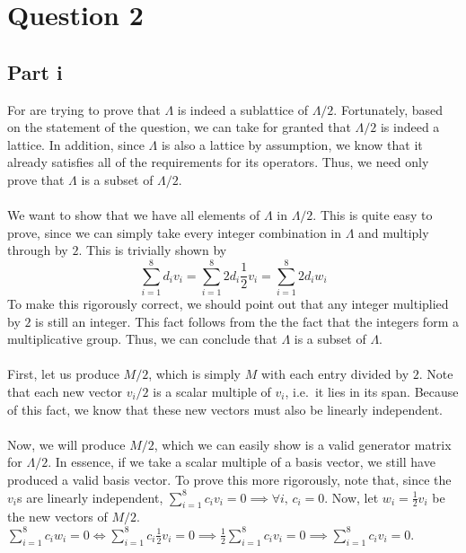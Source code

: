\documentclass[letterpaper]{article}
\begin{document}
\section{Question 2}
\label{sec:Question2}

\subsection{Part i}
\label{sub:2Parti}

For are trying to prove that $ \Lambda $ is indeed a sublattice of $ \Lambda / 2 $.
Fortunately, based on the statement of the question, we can take for granted that $ \Lambda / 2 $ is indeed a lattice.
In addition, since $ \Lambda $ is also a lattice by assumption, we know that it already satisfies all of the requirements for its operators.
Thus, we need only prove that $ \Lambda $ is a subset of $ \Lambda / 2 $.
\\ \\
We want to show that we have all elements of $ \Lambda $ in $ \Lambda / 2 $.
This is quite easy to prove, since we can simply take every integer combination in $ \Lambda $ and multiply through by $ 2 $.
This is trivially shown by
$$ \sum_{i = 1}^{8} d_i v_i = \sum_{i = 1}^{8} 2 d_i \frac{1}{2} v_i = \sum_{i = 1}^{8} 2 d_i w_i $$
To make this rigorously correct, we should point out that any integer multiplied by $ 2 $ is still an integer.
This fact follows from the the fact that the integers form a multiplicative group.
Thus, we can conclude that $ \Lambda $ is a subset of $ \Lambda $.
\\ \\
First, let us produce $ M / 2 $, which is simply $ M $ with each entry divided by $ 2 $.
Note that each new vector $ v_i / 2 $ is a scalar multiple of $ v_i $, i.e.\ it lies in its span.
Because of this fact, we know that these new vectors must also be linearly independent.
\\ \\
Now, we will produce $ M / 2 $, which we can easily show is a valid generator matrix for $ \Lambda / 2 $.
In essence, if we take a scalar multiple of a basis vector, we still have produced a valid basis vector.
To prove this more rigorously, note that, since the $ v_i $s are linearly independent, $ \sum_{i = 1}^{8} c_i v_i = 0 \implies \forall i, \, c_i = 0 $.
Now, let $ w_i = \frac{1}{2} v_i $ be the new vectors of $ M / 2 $.
$ \sum_{i = 1}^{8} c_i w_i = 0 \iff \sum_{i = 1}^{8} c_i \frac{1}{2} v_i = 0 \implies \frac{1}{2} \sum_{i = 1}^{8} c_i v_i = 0 \implies \sum_{i = 1}^{8} c_i v_i = 0 $.
\end{document}
